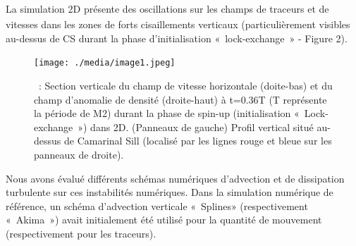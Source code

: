 \documentclass[12pt]{article}
\begin{document}
\begin{adjustwidth}{0.0in}{0.4in}
\begin{justify}
La simulation 2D\textsubscript{ }présente des oscillations sur les champs de traceurs et de vitesses dans les zones de forts cisaillements verticaux (particulièrement visibles au-dessus de CS durant la phase d’initialisation « lock-exchange » - Figure 2). 
\end{justify}\par

\end{adjustwidth}




\begin{figure}[H]
	\begin{Center}
		\texttt{[image: ./media/image1.jpeg]}
		\caption{ : Section verticale du champ de vitesse horizontale (doite-bas) et du champ d’anomalie de densité (droite-haut) à t=0.36T (T représente la période de M2) durant la phase de spin-up (initialisation « Lock-exchange ») dans 2D. (Panneaux de gauche) Profil vertical situé au-dessus de Camarinal Sill (localisé par les lignes rouge et bleue sur les panneaux de droite).}
		\label{fig:_Section_verticale_du_champ_de_vitesse_horizontale_doitebas_et_du_champ_danomalie_de_densit_droitehaut__t036T_T_reprsente_la_priode_de_M2_durant_la_phase_de_spinup_initialisation_Lockexchange_dans_2D_Panneaux_de_gauche_Profil_vertical_situ_audessus_de_Camarinal_Sill_localis_par_les_lignes_rouge_et_bleue_sur_les_panneaux_de_droite}
	\end{Center}
\end{figure}



\par

\begin{adjustwidth}{0.0in}{0.39in}
\par

\end{adjustwidth}

\begin{adjustwidth}{0.0in}{0.39in}
\begin{justify}
Nous avons évalué différents schémas numériques d’advection et de dissipation turbulente sur ces instabilités numériques. Dans la simulation numérique de référence, un schéma d’advection verticale « Splines» (respectivement « Akima ») avait initialement été utilisé pour la quantité de mouvement (respectivement pour les traceurs). 
\end{justify}\par

\end{adjustwidth}
\end{document}
